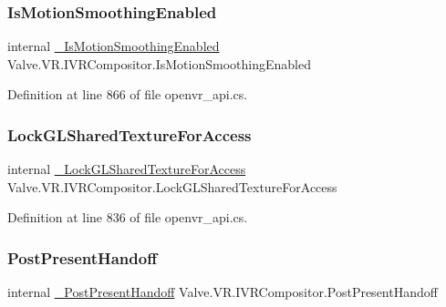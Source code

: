 \mbox{\label{struct_valve_1_1_v_r_1_1_i_v_r_compositor_ae7d87c497e0e72e63a8240ba48b3398b}} 
\subsubsection{\texorpdfstring{IsMotionSmoothingEnabled}{IsMotionSmoothingEnabled}}
{\footnotesize\ttfamily internal \mbox{\hyperlink{struct_valve_1_1_v_r_1_1_i_v_r_compositor_a1a133e0381c30b872f74b12228080e87}{\+\_\+\+Is\+Motion\+Smoothing\+Enabled}} Valve.\+V\+R.\+I\+V\+R\+Compositor.\+Is\+Motion\+Smoothing\+Enabled}



Definition at line 866 of file openvr\+\_\+api.\+cs.

\mbox{\label{struct_valve_1_1_v_r_1_1_i_v_r_compositor_a1fe3254db89bea4506082adb62200cf3}} 
\subsubsection{\texorpdfstring{LockGLSharedTextureForAccess}{LockGLSharedTextureForAccess}}
{\footnotesize\ttfamily internal \mbox{\hyperlink{struct_valve_1_1_v_r_1_1_i_v_r_compositor_af32b455cb8d7467ceaed3018cc163bfe}{\+\_\+\+Lock\+G\+L\+Shared\+Texture\+For\+Access}} Valve.\+V\+R.\+I\+V\+R\+Compositor.\+Lock\+G\+L\+Shared\+Texture\+For\+Access}



Definition at line 836 of file openvr\+\_\+api.\+cs.

\mbox{\label{struct_valve_1_1_v_r_1_1_i_v_r_compositor_aac1c3ee99b666cd9f38872f510d45161}} 
\subsubsection{\texorpdfstring{PostPresentHandoff}{PostPresentHandoff}}
{\footnotesize\ttfamily internal \mbox{\hyperlink{struct_valve_1_1_v_r_1_1_i_v_r_compositor_a1897063eebdbc1ee4d4ae821a6d584cc}{\+\_\+\+Post\+Present\+Handoff}} Valve.\+V\+R.\+I\+V\+R\+Compositor.\+Post\+Present\+Handoff}




